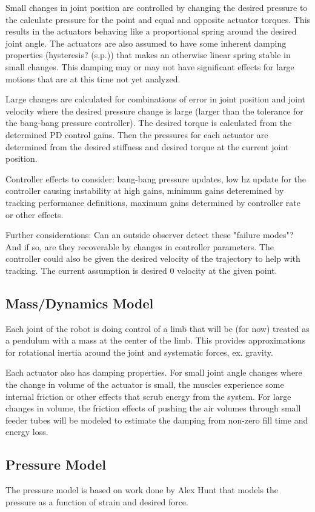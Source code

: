 \documentclass[12pt, letterpaper, oneside, notitlepage, onecolumn]{article}
\newcommand{\bbss}[1]{\subsection{#1}}
\begin{document}
Small changes in joint position are controlled by changing the desired pressure
to the calculate pressure for the point and equal and opposite actuator torques.
This results in the actuators behaving like a proportional spring around the
desired joint angle. The actuators are also assumed to have some inherent
damping properties (hysteresis? (s.p.)) that makes an otherwise linear spring
stable in small changes. This damping may or may not have significant effects
for large motions that are at this time not yet analyzed.

Large changes are calculated for combinations of error in joint position and
joint velocity where the desired pressure change is large (larger than the
tolerance for the bang-bang pressure controller). The desired torque is
calculated from the determined PD control gains. Then the pressures for each
actuator are determined from the desired stiffness and desired torque at the
current joint position.

Controller effects to consider: bang-bang pressure updates, low hz update for
the controller causing instability at high gains, minimum gains deteremined by
tracking performance definitions, maximum gains determined by controller rate or
other effects.

Further considerations: Can an outside observer detect these "failure modes"?
And if so, are they recoverable by changes in controller parameters. The
controller could also be given the desired velocity of the trajectory to help
with tracking. The current assumption is desired 0 velocity at the given point.

\bbss{Mass/Dynamics Model}

Each joint of the robot is doing control of a limb that will be (for now)
treated as a pendulum with a mass at the center of the limb. This provides
approximations for rotational inertia around the joint and systematic forces,
ex. gravity. 

Each actuator also has damping properties. For small joint angle changes where
the change in volume of the actuator is small, the muscles experience some
internal friction or other effects that scrub energy from the system. For large
changes in volume, the friction effects of pushing the air volumes through small
feeder tubes will be modeled to estimate the damping from non-zero fill time and
energy loss.

\bbss{Pressure Model}

The pressure model is based on work done by Alex Hunt that models the pressure
as a function of strain and desired force.
\end{document}
